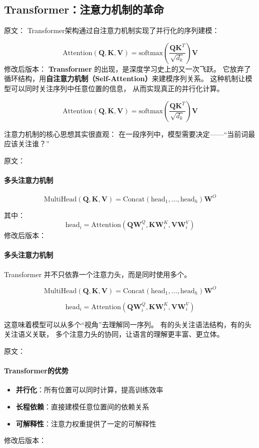 \subsection{Transformer：注意力机制的革命}

原文：
Transformer架构通过自注意力机制实现了并行化的序列建模：

$$\text{Attention}(\mathbf{Q}, \mathbf{K}, \mathbf{V}) = \text{softmax}\left(\frac{\mathbf{Q}\mathbf{K}^T}{\sqrt{d_k}}\right)\mathbf{V}$$
修改后版本：
\textbf{Transformer} 的出现，是深度学习史上的又一次飞跃。  
它放弃了循环结构，用\textbf{自注意力机制（Self-Attention）}来建模序列关系。  
这种机制让模型可以同时关注序列中任意位置的信息，  
从而实现真正的并行化计算。

$$\text{Attention}(\mathbf{Q}, \mathbf{K}, \mathbf{V}) = \text{softmax}\left(\frac{\mathbf{Q}\mathbf{K}^T}{\sqrt{d_k}}\right)\mathbf{V}$$

注意力机制的核心思想其实很直观：  
在一段序列中，模型需要决定——“当前词最应该关注谁？”



原文：
\paragraph{多头注意力机制}
$$\text{MultiHead}(\mathbf{Q}, \mathbf{K}, \mathbf{V}) = \text{Concat}(\text{head}_1, \ldots, \text{head}_h)\mathbf{W}^O$$

其中：
$$\text{head}_i = \text{Attention}(\mathbf{Q}\mathbf{W}_i^Q, \mathbf{K}\mathbf{W}_i^K, \mathbf{V}\mathbf{W}_i^V)$$
修改后版本：
\paragraph{多头注意力机制}  
Transformer 并不只依靠一个注意力头，而是同时使用多个。  

$$\text{MultiHead}(\mathbf{Q}, \mathbf{K}, \mathbf{V}) = \text{Concat}(\text{head}_1, \ldots, \text{head}_h)\mathbf{W}^O$$

$$\text{head}_i = \text{Attention}(\mathbf{Q}\mathbf{W}_i^Q, \mathbf{K}\mathbf{W}_i^K, \mathbf{V}\mathbf{W}_i^V)$$

这意味着模型可以从多个“视角”去理解同一序列。  
有的头关注语法结构，有的头关注语义关联，  
多个注意力头的协同，让语言的理解更丰富、更立体。



原文：
\paragraph{Transformer的优势}
\begin{itemize}
\item \textbf{并行化}：所有位置可以同时计算，提高训练效率
\item \textbf{长程依赖}：直接建模任意位置间的依赖关系
\item \textbf{可解释性}：注意力权重提供了一定的可解释性
\end{itemize}
修改后版本：
